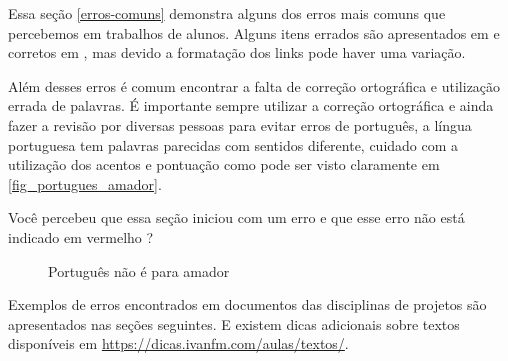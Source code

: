 Essa seção \autoref{erros-comuns} demonstra alguns dos erros mais comuns que percebemos em trabalhos de alunos. Alguns itens errados são apresentados em  e corretos em , mas devido a formatação dos links pode haver uma variação.

Além desses erros é comum encontrar a falta de correção ortográfica e utilização errada de palavras. É importante sempre utilizar a correção ortográfica e ainda fazer a revisão por diversas pessoas para evitar erros de português, a língua portuguesa tem palavras parecidas com sentidos diferente, cuidado com a utilização dos acentos e pontuação como pode ser visto claramente em  \autoref{fig_portugues_amador}.

Você percebeu que essa seção iniciou com um erro e que esse erro não está indicado em vermelho ?


\begin{figure}[htb]
    \centering
	\caption{\label{fig_portugues_amador}Português não é para amador}
\end{figure}


Exemplos de erros encontrados em documentos das disciplinas de projetos são apresentados nas seções seguintes. E existem dicas adicionais sobre textos disponíveis em \url{https://dicas.ivanfm.com/aulas/textos/}.




